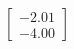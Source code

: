 \documentclass[preview]{standalone}
\begin{document}
\begin{align*}
\begin{bmatrix} -2.01 \\ -4.00 \end{bmatrix}
\end{align*}
\end{document}
